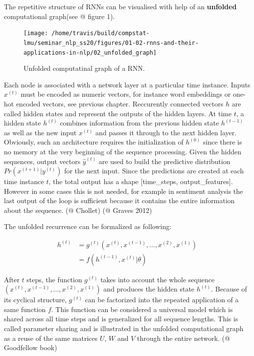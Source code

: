\documentclass[]{krantz}
\begin{document}
The repetitive structure of RNNs can be visualised with help of an \textbf{unfolded} computational graph(see @ figure 1).

\begin{figure}

{\centering \texttt{[image: /home/travis/build/compstat-lmu/seminar\_nlp\_ss20/figures/01-02-rnns-and-their-applications-in-nlp/02\_unfolded\_graph]} 

}

\caption{Unfolded computatinal graph of a RNN.}\label{fig:pressure}
\end{figure}

Each node is associated with a network layer at a particular time instance. Inputs \(x^{(t)}\) must be encoded as numeric vectors, for instance word embeddings or one-hot encoded vectors, see previous chapter. Reccurently connected vectors \(h\) are called hidden states and represent the outputs of the hidden layers. At time \(t\), a hidden state \(h^{(t)}\) combines information from the previous hidden state \(h^{(t-1)}\) as well as the new input \(x^{(t)}\) and passes it through to the next hidden layer. Obviously, such an architecture requires the initialization of \(h^{(0)}\) since there is no memory at the very beginning of the sequence processing. Given the hidden sequences, output vectors \(\hat{y}^{(t)}\) are used to build the predictive distribution \(Pr(x^{(t+1)}|y^{(t)})\) for the next input. Since the predictions are created at each time instance \(t\), the total output has a shape {[}time\_steps, output\_features{]}. However in some cases this is not needed, for example in sentiment analysis the last output of the loop is sufficient because it contains the entire information about the sequence. (@ Chollet) (@ Graves 2012)

The unfolded recurrence can be formalized as following:

\begin{align}
h^{(t)} & = g^{(t)}(x^{(t)},x^{(t-1)},...,x^{(2)}, x^{(1)}) \\
& = f(h^{(t-1)},x^{(t)}| \theta)  \label{eq:recurrent}
\end{align}

After \(t\) steps, the function \(g^{(t)}\) takes into account the whole sequence \((x^{(t)},x^{(t-1)},...,x^{(2)}, x^{(1)})\) and produces the hidden state \(h^{(t)}\). Because of its cyclical structure, \(g^{(t)}\) can be factorized into the repeated application of a same function \(f\). This function can be considered a universal model which is shared across all time steps and is generalized for all sequence lengths. This is called parameter sharing and is illustrated in the unfolded computational graph as a reuse of the same matrices \(U\), \(W\) and \(V\) through the entire network. (@ Goodfellow book)
\end{document}
